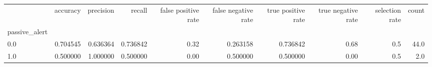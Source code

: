 \begin{tabular}{lrrrrrrrrr}
\toprule
{} &  accuracy &  precision &    recall &  false positive rate &  false negative rate &  true positive rate &  true negative rate &  selection rate &  count \\
passive\_alert &           &            &           &                      &                      &                     &                     &                 &        \\
\midrule
0.0           &  0.704545 &   0.636364 &  0.736842 &                 0.32 &             0.263158 &            0.736842 &                0.68 &             0.5 &   44.0 \\
1.0           &  0.500000 &   1.000000 &  0.500000 &                 0.00 &             0.500000 &            0.500000 &                0.00 &             0.5 &    2.0 \\
\bottomrule
\end{tabular}

